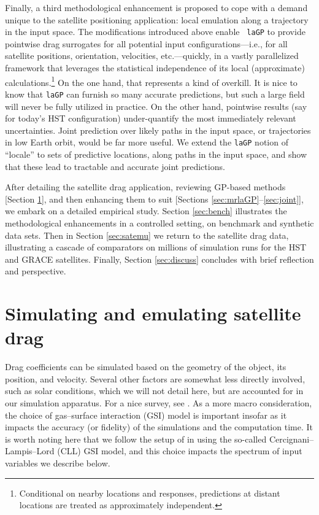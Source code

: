 \documentclass[12pt]{article}
\begin{document}
Finally, a third methodological enhancement is proposed to cope with a demand
unique to the satellite positioning application: local emulation along a
trajectory in the input space.  The modifications introduced above enable {\tt
laGP} to provide pointwise drag surrogates for all potential input
configurations---i.e., for all satellite positions, orientation, velocities,
etc.---quickly, in a vastly parallelized framework that leverages the
statistical independence of its local (approximate)
calculations.\footnote{Conditional on nearby locations and responses,
predictions at distant locations are treated as approximately independent.} On
the one hand, that represents a kind of overkill.  It is nice to know that
{\tt laGP} can furnish so many accurate predictions, but such a large field
will never be fully utilized in practice. On the other hand, pointwise results
(say for today's HST configuration) under-quantify the most immediately relevant uncertainties.  Joint prediction over likely paths in the input
space, or trajectories in low Earth orbit, would be far more useful.  We
extend the {\tt laGP} notion of ``locale'' to sets of predictive locations,
along paths in the input space, and show that these lead to tractable and
accurate joint predictions.  

After detailing the satellite drag application, reviewing GP-based methods
[Section \ref{sec:review}], and then enhancing them to suit [Sections
\ref{sec:mrlaGP}--\ref{sec:joint}],  we embark on a detailed empirical study.
Section \ref{sec:bench} illustrates the methodological enhancements in a
controlled setting, on benchmark and synthetic data sets. Then in Section
\ref{sec:satemu} we return to the satellite drag data, illustrating a cascade
of comparators on millions of simulation runs for the HST and GRACE
satellites. Finally, Section \ref{sec:discuss} concludes with brief
reflection and perspective.

\section{Simulating and emulating satellite drag}
\label{sec:review}

Drag coefficients can be simulated based on the geometry of the object, its
position, and velocity.  Several other factors are somewhat less directly involved,
such as solar conditions, which we will not detail here, but are accounted for
in our simulation apparatus. For a nice survey, see \citet{metha:etal:2014}.
As a more macro consideration, the choice of gas--surface interaction (GSI) model
is important insofar as it impacts the accuracy (or fidelity) of the
simulations and the computation time.  It is worth noting here that we follow
the setup of \citet{metha:etal:2014} in using the so-called
Cercignani--Lampis--Lord (CLL) \citep{cercignani:etal:1971} GSI model, and
this choice impacts the spectrum of input variables we describe below.
\end{document}
